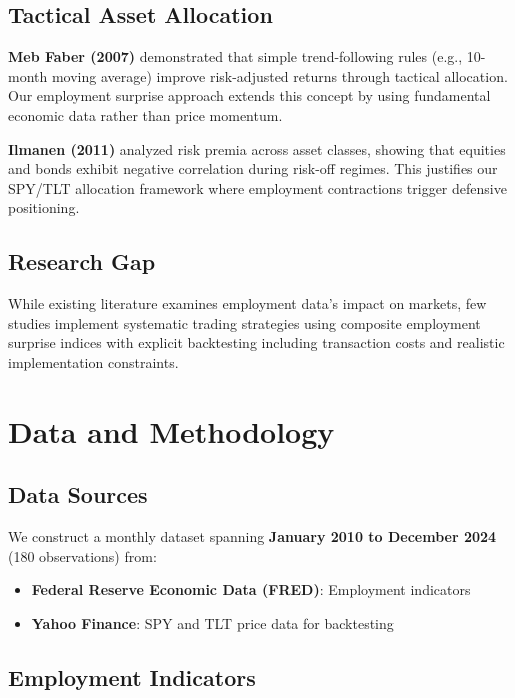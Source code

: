 \documentclass[12pt,a4paper]{article}
\begin{document}
\subsection{Tactical Asset Allocation}

\textbf{Meb Faber (2007)} demonstrated that simple trend-following rules (e.g., 10-month moving average) improve risk-adjusted returns through tactical allocation. Our employment surprise approach extends this concept by using fundamental economic data rather than price momentum.

\textbf{Ilmanen (2011)} analyzed risk premia across asset classes, showing that equities and bonds exhibit negative correlation during risk-off regimes. This justifies our SPY/TLT allocation framework where employment contractions trigger defensive positioning.

\subsection{Research Gap}

While existing literature examines employment data's impact on markets, few studies implement systematic trading strategies using composite employment surprise indices with explicit backtesting including transaction costs and realistic implementation constraints.

\newpage
\section{Data and Methodology}

\subsection{Data Sources}

We construct a monthly dataset spanning \textbf{January 2010 to December 2024} (180 observations) from:

\begin{itemize}
    \item \textbf{Federal Reserve Economic Data (FRED)}: Employment indicators
    \item \textbf{Yahoo Finance}: SPY and TLT price data for backtesting
\end{itemize}

\subsection{Employment Indicators}
\end{document}
